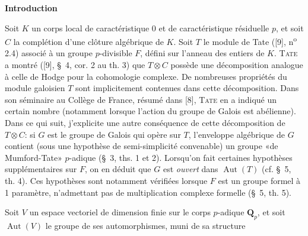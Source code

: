 \begin{center}\textbf{Introduction}\end{center}

Soit $K$ un corps local de caractéristique 0 et de caractéristique résiduelle $p$, et soit $C$ la complétion d'une clôture algébrique de $K$. Soit $T$ le module de Tate ([9], n\textsuperscript{o} 2.4) associé à un groupe $p$-divisible $F$, défini sur l'anneau des entiers de $K$. \textsc{Tate} a montré ([9], \S\ 4, cor. 2 au th. 3) que $T\otimes C$ possède une décomposition analogue à celle de Hodge pour la cohomologie complexe. De nombreuses propriétés du module galoisien $T$ sont implicitement contenues dans cette décomposition. Dans son séminaire au Collège de France, résumé dans [8], \textsc{Tate} en a indiqué un certain nombre (notamment lorsque l'action du groupe de Galois est abélienne). Dans ce qui suit, j'explicite une autre conséquence de cette décomposition de $T\otimes C$: si $G$ est le groupe de Galois qui opère sur $T$, l'enveloppe algébrique de $G$ contient (sous une hypothèse de semi-simplicité convenable) un groupe «de Mumford-Tate» $p$-adique (\S\ 3, ths. 1 et 2). Lorsqu'on fait certaines hypothèses supplémentaires sur $F$, on en déduit que $G$ est \textit{ouvert} dans $\operatorname{Aut}(T)$ (cf. \S\ 5, th. 4). Ces hypothèses sont notamment vérifiées lorsque $F$ est un groupe formel à 1 paramètre, n'admettant pas de multiplication complexe formelle (\S\ 5, th. 5).


Soit $V$ un espace vectoriel de dimension finie sur le corps $p$-adique $\mathbf Q_p$, et soit $\operatorname{Aut}(V)$ le groupe de ses automorphismes, muni de sa structure

